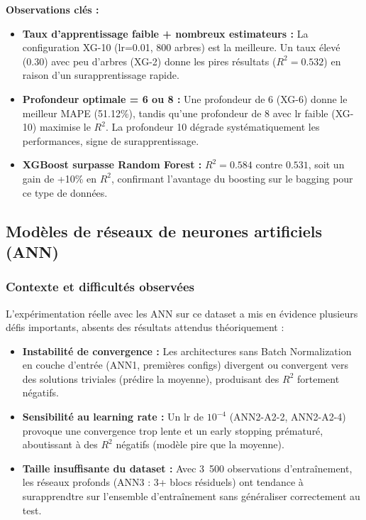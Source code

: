 \documentclass[12pt,a4paper]{article}
\begin{document}
\textbf{Observations clés :}

\begin{itemize}[leftmargin=*]
    \item \textbf{Taux d'apprentissage faible + nombreux estimateurs :} La configuration
    XG-10 (lr=0.01, 800 arbres) est la meilleure. Un taux élevé (0.30) avec peu
    d'arbres (XG-2) donne les pires résultats ($R^2 = 0.532$) en raison d'un
    surapprentissage rapide.

    \item \textbf{Profondeur optimale = 6 ou 8 :} Une profondeur de 6 (XG-6) donne
    le meilleur MAPE (51.12\%), tandis qu'une profondeur de 8 avec lr faible (XG-10)
    maximise le $R^2$. La profondeur 10 dégrade systématiquement les performances,
    signe de surapprentissage.

    \item \textbf{XGBoost surpasse Random Forest :} $R^2 = 0.584$ contre $0.531$,
    soit un gain de +10\% en $R^2$, confirmant l'avantage du boosting sur le bagging
    pour ce type de données.
\end{itemize}

\newpage

\subsection{Modèles de réseaux de neurones artificiels (ANN)}

\subsubsection{Contexte et difficultés observées}

L'expérimentation réelle avec les ANN sur ce dataset a mis en évidence plusieurs
défis importants, absents des résultats attendus théoriquement :

\begin{itemize}[leftmargin=*]
    \item \textbf{Instabilité de convergence :} Les architectures sans Batch
    Normalization en couche d'entrée (ANN1, premières configs) divergent ou convergent
    vers des solutions triviales (prédire la moyenne), produisant des $R^2$ fortement
    négatifs.

    \item \textbf{Sensibilité au learning rate :} Un lr de $10^{-4}$ (ANN2-A2-2,
    ANN2-A2-4) provoque une convergence trop lente et un early stopping prématuré,
    aboutissant à des $R^2$ négatifs (modèle pire que la moyenne).

    \item \textbf{Taille insuffisante du dataset :} Avec 3~500 observations
    d'entraînement, les réseaux profonds (ANN3 : 3+ blocs résiduels) ont tendance à
    surapprendtre sur l'ensemble d'entraînement sans généraliser correctement au
    test.
\end{itemize}
\end{document}
